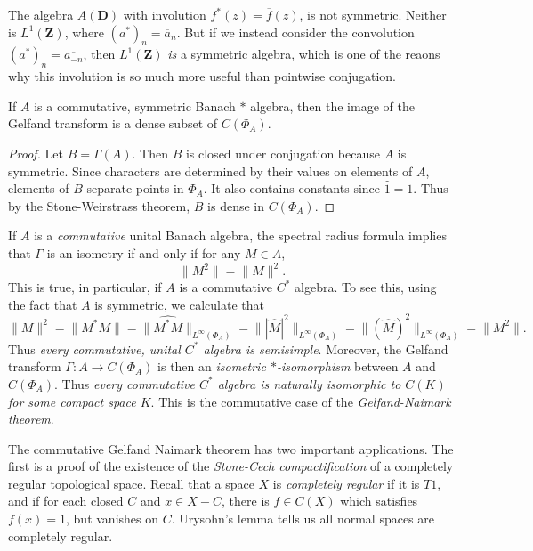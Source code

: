 \begin{remark}
    The algebra $A(\mathbf{D})$ with involution $f^*(z) = \overline{f}(\overline{z})$, is not symmetric. Neither is $L^1(\mathbf{Z})$, where $(a^*)_n = \overline{a}_n$. But if we instead consider the convolution $(a^*)_n = \overline{a_{-n}}$, then $L^1(\mathbf{Z})$ \emph{is} a symmetric algebra, which is one of the reaons why this involution is so much more useful than pointwise conjugation.
\end{remark}

\begin{theorem}
    If $A$ is a commutative, symmetric Banach $*$ algebra, then the image of the Gelfand transform is a dense subset of $C(\Phi_A)$.
\end{theorem}
\begin{proof}
    Let $B = \Gamma(A)$. Then $B$ is closed under conjugation because $A$ is symmetric. Since characters are determined by their values on elements of $A$, elements of $B$ separate points in $\Phi_A$. It also contains constants since $\widehat{1} = 1$. Thus by the Stone-Weirstrass theorem, $B$ is dense in $C(\Phi_A)$.
\end{proof}

If $A$ is a \emph{commutative} unital Banach algebra, the spectral radius formula implies that $\Gamma$ is an isometry if and only if for any $M \in A$,
%
\[ \| M^2 \| = \| M \|^2. \]
%
This is true, in particular, if $A$ is a commutative $C^*$ algebra. To see this, using the fact that $A$ is symmetric, we calculate that
%
\[ \| M \|^2 = \| M^* M \| = \| \widehat{M^* M} \|_{L^\infty(\Phi_A)} = \| |\widehat{M}|^2 \|_{L^\infty(\Phi_A)} = \| (\widehat{M})^2 \|_{L^\infty(\Phi_A)} = \| M^2 \|. \]
%
Thus \emph{every commutative, unital $C^*$ algebra is semisimple}. Moreover, the Gelfand transform $\Gamma: A \to C(\Phi_A)$ is then an \emph{isometric $*$-isomorphism} between $A$ and $C(\Phi_A)$. Thus \emph{every commutative $C^*$ algebra is naturally isomorphic to $C(K)$ for some compact space $K$}. This is the commutative case of the \emph{Gelfand-Naimark theorem}.

The commutative Gelfand Naimark theorem has two important applications. The first is a proof of the existence of the \emph{Stone-Cech compactification} of a completely regular topological space. Recall that a space $X$ is \emph{completely regular} if it is $T1$, and if for each closed $C$ and $x \in X - C$, there is $f \in C(X)$ which satisfies $f(x) = 1$, but vanishes on $C$. Urysohn's lemma tells us all normal spaces are completely regular.

